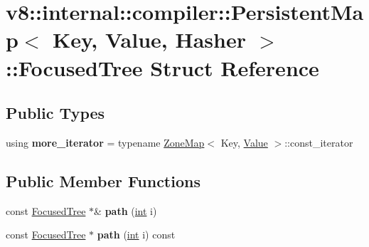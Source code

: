 \hypertarget{structv8_1_1internal_1_1compiler_1_1PersistentMap_1_1FocusedTree}{}\section{v8\+:\+:internal\+:\+:compiler\+:\+:Persistent\+Map$<$ Key, Value, Hasher $>$\+:\+:Focused\+Tree Struct Reference}
\label{structv8_1_1internal_1_1compiler_1_1PersistentMap_1_1FocusedTree}
\subsection*{Public Types}
\begin{DoxyCompactItemize}
\item 
\mbox{\label{structv8_1_1internal_1_1compiler_1_1PersistentMap_1_1FocusedTree_a8e9f877218d6bc12967857353ff2c024}} 
using {\bfseries more\+\_\+iterator} = typename \mbox{\hyperlink{classv8_1_1internal_1_1ZoneMap}{Zone\+Map}}$<$ Key, \mbox{\hyperlink{classv8_1_1Value}{Value}} $>$\+::const\+\_\+iterator
\end{DoxyCompactItemize}
\subsection*{Public Member Functions}
\begin{DoxyCompactItemize}
\item 
\mbox{\label{structv8_1_1internal_1_1compiler_1_1PersistentMap_1_1FocusedTree_acd891d1f6622915e83793d5fcb38a890}} 
const \mbox{\hyperlink{structv8_1_1internal_1_1compiler_1_1PersistentMap_1_1FocusedTree}{Focused\+Tree}} $\ast$\& {\bfseries path} (\mbox{\hyperlink{classint}{int}} i)
\item 
\mbox{\label{structv8_1_1internal_1_1compiler_1_1PersistentMap_1_1FocusedTree_a8af3daa9f487411feda440ae2fa3c227}} 
const \mbox{\hyperlink{structv8_1_1internal_1_1compiler_1_1PersistentMap_1_1FocusedTree}{Focused\+Tree}} $\ast$ {\bfseries path} (\mbox{\hyperlink{classint}{int}} i) const
\end{DoxyCompactItemize}
